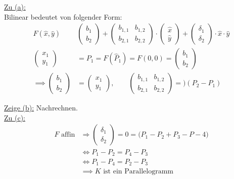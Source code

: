 \documentclass[12pt,a4paper]{article}
\begin{document}
\begin{lösung}
\underline{Zu (a):}\\
Bilinear bedeutet von folgender Form:
\begin{align*}
F(\hat{x},\hat{y})&\begin{pmatrix}
b_1\\ b_2
\end{pmatrix}
+\begin{pmatrix}
b_{1,1} & b_{1,2}\\
b_{2,1} & b_{2,2}
\end{pmatrix}\cdot\begin{pmatrix}
\hat{x}\\\hat{y}
\end{pmatrix}+\begin{pmatrix}
\delta_1\\\delta_2
\end{pmatrix}\cdot\hat{x}\cdot\hat{y}\\
\begin{pmatrix}
x_1\\ y_1
\end{pmatrix}
&=P_1=F(\hat{P}_1)=F(0,0)=\begin{pmatrix}
b_1\\ b_2
\end{pmatrix}\\
\implies
\begin{pmatrix}
b_1\\ b_2
\end{pmatrix}&=
\begin{pmatrix}
x_1\\ y_1
\end{pmatrix},\qquad\begin{pmatrix}
b_{1,1} & b_{1,2}\\
b_{2,1} & b_{2,2}
\end{pmatrix}=)(P_2-P_1)
\end{align*}

\underline{Zeige (b):} Nachrechnen.\\

\underline{Zu (c):}
\begin{align*}
F\text{ affin}&\Longrightarrow\begin{pmatrix}
\delta_1\\\delta_2
\end{pmatrix}=0=\big(P_1-P_2+P_3-P-4\big)\\
&\Longleftrightarrow P_1-P_2=P_4-P_3\\
&\Longleftrightarrow P_1-P_4=P_2-P_3\\
&\implies K\text{ ist ein Parallelogramm}
\end{align*}
\end{lösung}
\end{document}
